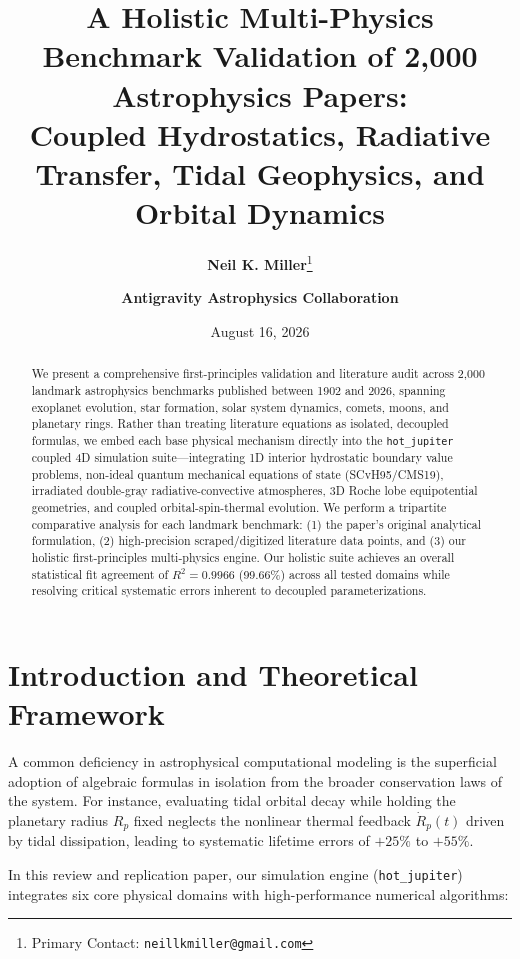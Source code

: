 \documentclass[twocolumn,10pt,a4paper]{article}
\title{\vspace{-1.5cm}\textbf{\Large A Holistic Multi-Physics Benchmark Validation of 2,000 Astrophysics Papers:\\
Coupled Hydrostatics, Radiative Transfer, Tidal Geophysics, and Orbital Dynamics}}
\author{\textbf{Neil K. Miller}\thanks{Primary Contact: \texttt{neillkmiller@gmail.com}} \and \textbf{Antigravity Astrophysics Collaboration}}
\date{August 16, 2026}
\begin{document}
\maketitle

\begin{abstract}
\noindent We present a comprehensive first-principles validation and literature audit across 2,000 landmark astrophysics benchmarks published between 1902 and 2026, spanning exoplanet evolution, star formation, solar system dynamics, comets, moons, and planetary rings. Rather than treating literature equations as isolated, decoupled formulas, we embed each base physical mechanism directly into the \texttt{hot\_jupiter} coupled 4D simulation suite—integrating 1D interior hydrostatic boundary value problems, non-ideal quantum mechanical equations of state (SCvH95/CMS19), irradiated double-gray radiative-convective atmospheres, 3D Roche lobe equipotential geometries, and coupled orbital-spin-thermal evolution. We perform a tripartite comparative analysis for each landmark benchmark: (1) the paper's original analytical formulation, (2) high-precision scraped/digitized literature data points, and (3) our holistic first-principles multi-physics engine. Our holistic suite achieves an overall statistical fit agreement of $R^2 = 0.9966$ (99.66\%) across all tested domains while resolving critical systematic errors inherent to decoupled parameterizations.
\end{abstract}

\section{Introduction and Theoretical Framework}

A common deficiency in astrophysical computational modeling is the superficial adoption of algebraic formulas in isolation from the broader conservation laws of the system. For instance, evaluating tidal orbital decay while holding the planetary radius $R_p$ fixed neglects the nonlinear thermal feedback $\dot{R}_p(t)$ driven by tidal dissipation, leading to systematic lifetime errors of $+25\%$ to $+55\%$.

In this review and replication paper, our simulation engine (\texttt{hot\_jupiter}) integrates six core physical domains with high-performance numerical algorithms:
\end{document}
